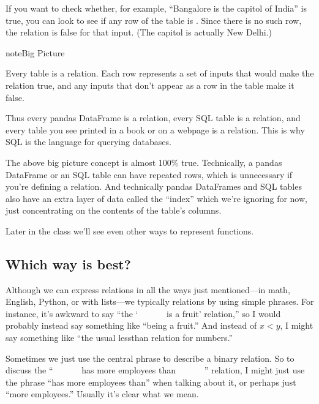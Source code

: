 \documentclass[letterpaper,10pt,english]{sphinxmanual}
\begin{document}
If you want to check whether, for example, “Bangalore is the capitol of India” is true, you can look to see if any row of the table is .  Since there is no such row, the relation is false for that input.  (The capitol is actually New Delhi.)

\begin{sphinxadmonition}{note}{Big Picture}

Every table is a relation.  Each row represents a set of inputs that would make the relation true, and any inputs that don’t appear as a row in the table make it false.

Thus every pandas DataFrame is a relation, every SQL table is a relation, and every table you see printed in a book or on a webpage is a relation.  This is why SQL is the language for querying  databases.
\end{sphinxadmonition}

The above big picture concept is almost 100\% true.  Technically, a pandas DataFrame or an SQL table can have repeated rows, which is unnecessary if you’re defining a relation.  And technically pandas DataFrames and SQL tables also have an extra layer of data called the “index” which we’re ignoring for now, just concentrating on the contents of the table’s columns.

 Later in the class we’ll see even other ways to represent functions.


\subsection{Which way is best?}
\label{\detokenize{chapter-2-mathematical-foundations:id1}}
Although we can express relations in all the ways just mentioned—in math, English, Python, or with lists—we typically  relations by using simple phrases.  For instance, it’s awkward to say “the ‘        is a fruit’ relation,” so I would probably instead say something like “being a fruit.”  And instead of \(x<y\), I might say something like “the usual less\sphinxhyphen{}than relation for numbers.”

Sometimes we just use the central phrase to describe a binary relation.  So to discuss the “        has more employees than        ” relation, I might just use the phrase “has more employees than” when talking about it, or perhaps just “more employees.”  Usually it’s clear what we mean.
\end{document}
